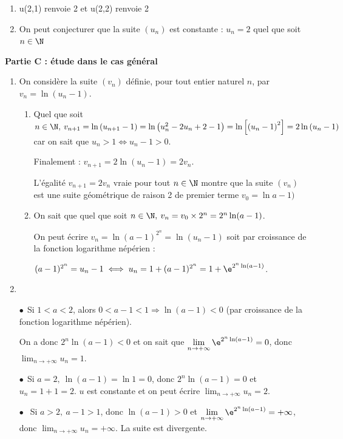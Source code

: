 \medskip

\begin{enumerate}
\item u(2,1) renvoie 2 et u(2,2) renvoie 2
















\item 



On peut conjecturer que la suite $\left(u_n\right)$ est constante : $u_n = 2$ quel que soit $n \in \N$
\end{enumerate}

\bigskip

\textbf{Partie C : étude dans le cas général}

\medskip

\begin{enumerate}
\item On considère la suite $\left(v_n\right)$ définie, pour tout entier naturel $n$, par $v_n = \ln \left(u_n - 1\right)$.
	\begin{enumerate}
		\item 
Quel que soit $n \in \N, \: v_{n+1} = \ln \left(u_{n+1} - 1\right) = \ln \left(u_n^2 - 2u_n + 2 - 1\right) = \ln \left[\left(u_n - 1\right)^2\right] = 2\ln \left(u_n - 1\right)$ car on sait que $u_n > 1 \iff u_n - 1 > 0$.

Finalement : $v_{n+1} = 2\ln \left(u_n - 1\right) = 2v_n$.

L'égalité $v_{n+1} = 2v_n$ vraie pour tout $n \in \N$ montre que la suite $\left(v_n\right)$ est une suite géométrique de raison 2 de premier terme $v_0 = \ln a - 1)$
		\item 
On sait que quel que soit $n \in \N, \: v_n = v_0 \times 2^n = 2^n\ln (a - 1)$.

On peut écrire  $v_n = \ln (a - 1)^{2^n} = \ln \left(u_n - 1\right)$ soit par croissance de la fonction logarithme népérien :

$(a - 1)^{2^n} = u_n - 1 \iff u_n = 1 + (a - 1)^{2^n} = 1 + \e^{2^n \ln (a - 1)}$.
	\end{enumerate}
\item ~

$\bullet~~$Si $1 < a < 2$, alors $0 < a - 1 < 1 \Rightarrow \ln (a - 1) < 0$ (par croissance de la fonction logarithme népérien).

On a donc $2^n \ln (a - 1) < 0$ et on sait que $\displaystyle\lim_{n \to + \infty} \e^{2^n \ln (a - 1)} = 0$, donc $\displaystyle\lim_{n \to + \infty}u_n = 1$.

$\bullet~~$Si $a = 2, \: \ln (a - 1) = \ln 1 = 0$, donc $2^n \ln (a - 1) = 0$ et $u_n = 1 + 1 = 2$. $u$ est constante et on peut écrire $\displaystyle\lim_{n \to + \infty}u_n = 2$.

$\bullet~~$ Si $a > 2, \: a - 1 > 1$, donc $\ln (a - 1) > 0$ et $\displaystyle\lim_{n \to + \infty} \e^{2^n \ln (a - 1)} = + \infty$, donc $\displaystyle\lim_{n \to + \infty}u_n = + \infty$. La suite est divergente.
\end{enumerate}

\bigskip
